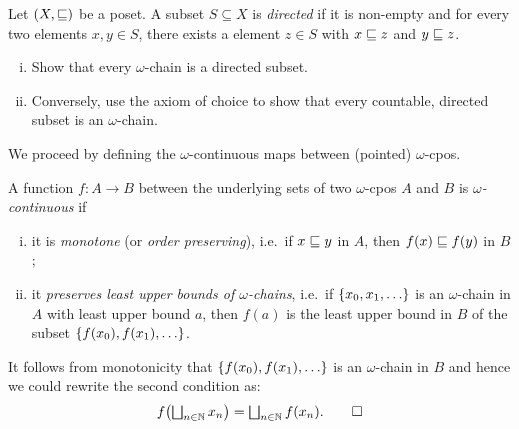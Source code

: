 \begin{exercise}\label{exer:directedness}
  Let \((X,{\sqsubseteq})\) be a poset. A subset \(S \subseteq X\) is \emph{directed}
  if it is non-empty and for every two elements \(x,y \in S\), there exists a
  element \(z \in S\) with \(x \sqsubseteq z\) and \(y \sqsubseteq z\).
  \begin{enumerate}[(i)]
  \item Show that every \(\omega\)-chain is a directed subset.
  \item Conversely, use the axiom of choice to show that every countable,
    directed subset is an \(\omega\)-chain.\qedhere
  \end{enumerate}
\end{exercise}

We proceed by defining the \(\omega\)-continuous maps between (pointed)
\(\omega\)-cpos.
\begin{definition}\label{def:continuity}
  A function \(f \colon A \to B\) between the underlying sets of two
  \(\omega\)-cpos \(A\) and \(B\) is \emph{\(\omega\)-continuous} if
  \begin{enumerate}[(i)]
  \item\label{monotone} it is \emph{monotone} (or \emph{order preserving}),
    i.e.\ if \(x \sqsubseteq y\) in \(A\), then \(f(x) \sqsubseteq f(y)\) in \(B\);
  \item\label{preserve-lub-of-omega-chains} it \emph{preserves least upper
      bounds of \(\omega\)-chains}, i.e.\ if \(\set{x_0,x_1,\dots}\) is an
    \(\omega\)-chain in \(A\) with least upper bound \(a\), then \(f(a)\) is the
    least upper bound in \(B\) of the subset \(\set{f(x_0),f(x_1),\dots}\). \qedhere
  \end{enumerate}
\end{definition}

\begin{remark}
  It follows from monotonicity that \(\set{f(x_0),f(x_1),\dots}\) is an
  \(\omega\)-chain in \(B\) and hence we could rewrite the second condition as:
  \[
    f\pa*{\textstyle\bigsqcup_{n \in \Nat}x_n} = \textstyle\bigsqcup_{n \in
      \Nat}f(x_n). \qedhere
  \]
\end{remark}


